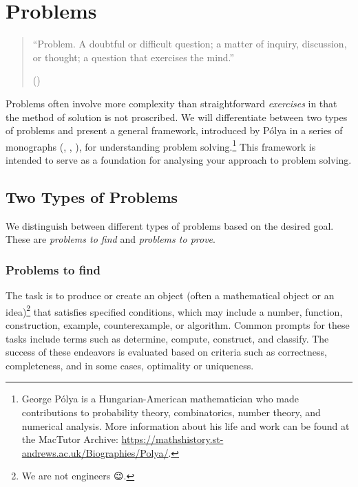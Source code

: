 \documentclass[
  a4paper,
  DIV=11,
  numbers=noendperiod,
  oneside]{scrreprt}
\begin{document}
\chapter{Problems}\label{sec-problems}

\begin{quote}
``Problem. A doubtful or difficult question; a matter of inquiry,
discussion, or thought; a question that exercises the mind.''

()
\end{quote}

Problems often involve more complexity than straightforward
\emph{exercises} in that the method of solution is not proscribed. We
will differentiate between two types of problems and present a general
framework, introduced by Pólya in a series of monographs
(,
, ),
for understanding problem solving.\footnote{George Pólya is a
  Hungarian-American mathematician who made contributions to probability
  theory, combinatorics, number theory, and numerical analysis. More
  information about his life and work can be found at the MacTutor
  Archive:
  \url{https://mathshistory.st-andrews.ac.uk/Biographies/Polya/}.} This
framework is intended to serve as a foundation for analysing your
approach to problem solving.

\section{Two Types of Problems}\label{two-types-of-problems}

We distinguish between different types of problems based on the desired
goal. These are \emph{problems to find} and \emph{problems to prove}.

\subsection{Problems to find}\label{problems-to-find}

The task is to produce or create an object (often a mathematical object
or an idea)\footnote{We are not engineers 😉.} that satisfies specified
conditions, which may include a number, function, construction, example,
counterexample, or algorithm. Common prompts for these tasks include
terms such as determine, compute, construct, and classify. The success
of these endeavors is evaluated based on criteria such as correctness,
completeness, and in some cases, optimality or uniqueness.
\end{document}
